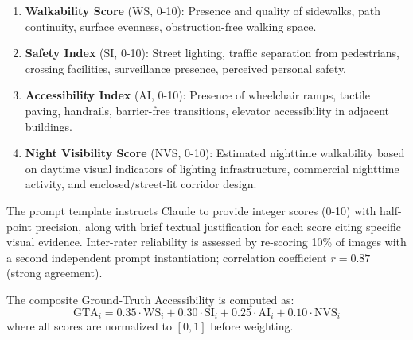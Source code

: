 \documentclass[preprint,12pt,authoryear]{elsarticle}
\begin{document}
\begin{enumerate}
    \item \textbf{Walkability Score} (WS, 0-10): Presence and quality of sidewalks, path continuity, surface evenness, obstruction-free walking space.
    \item \textbf{Safety Index} (SI, 0-10): Street lighting, traffic separation from pedestrians, crossing facilities, surveillance presence, perceived personal safety.
    \item \textbf{Accessibility Index} (AI, 0-10): Presence of wheelchair ramps, tactile paving, handrails, barrier-free transitions, elevator accessibility in adjacent buildings.
    \item \textbf{Night Visibility Score} (NVS, 0-10): Estimated nighttime walkability based on daytime visual indicators of lighting infrastructure, commercial nighttime activity, and enclosed/street-lit corridor design.
\end{enumerate}

The prompt template instructs Claude to provide integer scores (0-10) with half-point precision, along with brief textual justification for each score citing specific visual evidence. Inter-rater reliability is assessed by re-scoring 10\% of images with a second independent prompt instantiation; correlation coefficient $r = 0.87$ (strong agreement).

The composite Ground-Truth Accessibility is computed as:
\begin{equation}
\text{GTA}_i = 0.35 \cdot \text{WS}_i + 0.30 \cdot \text{SI}_i + 0.25 \cdot \text{AI}_i + 0.10 \cdot \text{NVS}_i
\label{eq:gta}
\end{equation}
where all scores are normalized to $[0,1]$ before weighting.
\end{document}

